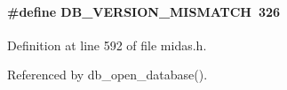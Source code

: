\paragraph[{DB\_\-VERSION\_\-MISMATCH}]{\setlength{\rightskip}{0pt plus 5cm}\#define DB\_\-VERSION\_\-MISMATCH~326}\hfill\label{group__err23_gaf466ab5a9f2f1febef5fb3e4c12df14b}

\begin{DoxyItemize}
\item 
\end{DoxyItemize}

Definition at line 592 of file midas.h.

Referenced by db\_\-open\_\-database().